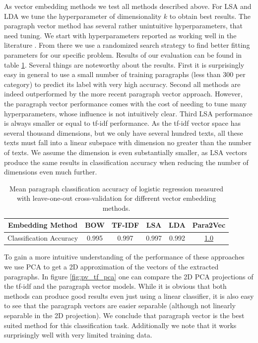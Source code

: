 As vector embedding methods we test all methods described above. For LSA and LDA we tune the hyperparameter of dimensionality $k$ to obtain best results. The paragraph vector method has several rather unintuitive hyperparameters, that need tuning. We start with hyperparameters reported as working well in the literature \citep{Lau2016}. From there we use a randomized search strategy to find better fitting parameters for our specific problem. Results of our evaluation can be found in table \ref{table:para_class_acc}. Several things are noteworthy about the results. First it is surprisingly easy in general to use a small number of training paragraphs (less than 300 per category) to predict its label with very high accuracy. Second all methods are indeed outperformed by the more recent paragraph vector approach. However, the paragraph vector performance comes with the cost of needing to tune many hyperparameters, whose influence is not intuitively clear. Third LSA performance is always smaller or equal to tf-idf performance. As the tf-idf vector space has several thousand dimensions, but we only have several hundred texts, all these texts must fall into a linear subspace with dimension no greater than the number of texts. We assume the dimension is even substantially smaller, as LSA vectors produce the same results in classification accuracy when reducing the number of dimensions even much further.
\begin{table}[h]
	\begin{tabular}{|c||c|c|c|c|c|}
		\hline 
		Embedding Method & BOW & TF-IDF & LSA & LDA  & Para2Vec\tabularnewline
		\hline 
		\hline 
		Classification Accuracy & 0.995 & 0.997 & 0.997 & 0.992 & \underline{1.0}\tabularnewline
		\hline 
	\end{tabular}
	\caption{Mean paragraph classification accuracy of logistic regression measured with leave-one-out cross-validation for different vector embedding methods.}
	\label{table:para_class_acc}
\end{table}

To gain a more intuitive understanding of the performance of these approaches we use PCA to get a 2D approximation of the vectors of the extracted paragraphs. In figure \ref{fig:pv_tf_pca} one can compare the 2D PCA projections of the tf-idf and the paragraph vector models. While it is obvious that both methods can produce good results even just using a linear classifier, it is also easy to see that the paragraph vectors are easier separable (although not linearly separable in the 2D projection). We conclude that paragraph vector is the best suited method for this classification task. Additionally we note that it works surprisingly well with very limited training data.


